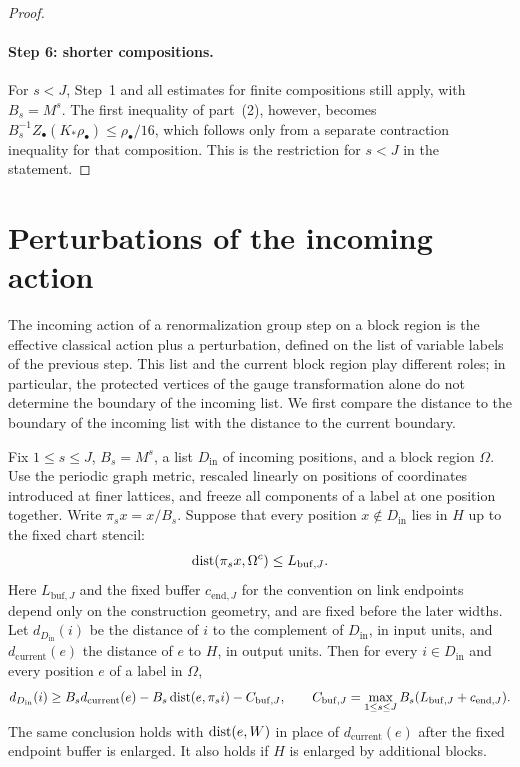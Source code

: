 \begin{proof}
\paragraph{Step 6: shorter compositions.}
For $s<J$, Step~1 and all estimates for finite compositions still apply, with $B_s=M^s$. The first inequality of part~(2), however, becomes $B_s^{-1}Z_\bullet(K_*\rho_\bullet)\le\rho_\bullet/16$, which follows only from a separate contraction inequality for that composition. This is the restriction for $s<J$ in the statement.
\end{proof}

\section{Perturbations of the incoming action}\label{ch16:sec:perturbation}

The incoming action of a renormalization group step on a block region is the effective classical action plus a perturbation, defined on the list of variable labels of the previous step. This list and the current block region play different roles; in particular, the protected vertices of the gauge transformation alone do not determine the boundary of the incoming list. We first compare the distance to the boundary of the incoming list with the distance to the current boundary.

\begin{lemma}\label{ch16:lem:input-wall-distance}
Fix $1\le s\le J$, $B_s=M^s$, a list $D_{\mathrm{in}}$ of incoming positions, and a block region $\Omega$. Use the periodic graph metric, rescaled linearly on positions of coordinates introduced at finer lattices, and freeze all components of a label at one position together. Write $\pi_sx=x/B_s$. Suppose that every position $x\notin D_{\mathrm{in}}$ lies in $H$ up to the fixed chart stencil:
\[
 \operatorname{dist}(\pi_sx,\Omega^c)\le L_{\mathrm{buf},J}.
\]
Here $L_{\mathrm{buf},J}$ and the fixed buffer $c_{\mathrm{end},J}$ for the convention on link endpoints depend only on the construction geometry, and are fixed before the later widths. Let $d_{D_{\mathrm{in}}}(i)$ be the distance of $i$ to the complement of $D_{\mathrm{in}}$, in input units, and $d_{\mathrm{current}}(e)$ the distance of $e$ to $H$, in output units. Then for every $i\in D_{\mathrm{in}}$ and every position $e$ of a label in $\Omega$,
\begin{equation}\label{ch16:eq:input-wall-comparison}
 d_{D_{\mathrm{in}}}(i)\ge B_s d_{\mathrm{current}}(e)
       -B_s\operatorname{dist}(e,\pi_si)-C_{\mathrm{buf},J},\qquad
 C_{\mathrm{buf},J}=
       \max_{1\le s\le J}B_s(L_{\mathrm{buf},J}+c_{\mathrm{end},J}).
\end{equation}
The same conclusion holds with $\operatorname{dist}(e,W)$ in place of $d_{\mathrm{current}}(e)$ after the fixed endpoint buffer is enlarged. It also holds if $H$ is enlarged by additional blocks.
\end{lemma}

